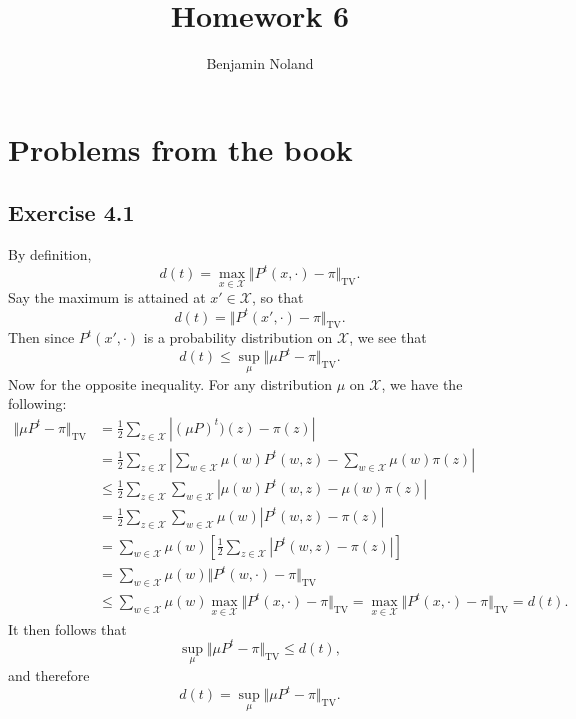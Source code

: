 \documentclass[12pt]{article}
\title{Homework 6}
\author{Benjamin Noland}
\date{}
\begin{document}
\maketitle

\section*{Problems from the book}

\subsection*{Exercise 4.1}

By definition,
\begin{equation*}
d(t) = \max_{x \in \mathcal{X}} \Vert P^t(x, \cdot) - \pi \Vert_\mathrm{TV}.
\end{equation*}
Say the maximum is attained at $x' \in \mathcal{X}$, so that
\begin{equation*}
d(t) = \Vert P^t(x', \cdot) - \pi \Vert_\mathrm{TV}.
\end{equation*}
Then since $P^t(x', \cdot)$ is a probability distribution on $\mathcal{X}$, we see that
\begin{equation*}
d(t) \leq \sup_{\mu} \Vert \mu P^t - \pi \Vert_\mathrm{TV}.
\end{equation*}
Now for the opposite inequality. For any distribution $\mu$ on $\mathcal{X}$, we have the following:
\begin{align*}
\Vert \mu P^t - \pi \Vert_\mathrm{TV} &= \frac{1}{2} \sum_{z \in \mathcal{X}} \left| (\mu P)^t)(z) - \pi(z) \right| \\
&= \frac{1}{2} \sum_{z \in \mathcal{X}} \left| \sum_{w \in \mathcal{X}} \mu(w) P^t(w, z) - \sum_{w \in \mathcal{X}} \mu(w) \pi(z) \right| \\
&\leq \frac{1}{2} \sum_{z \in \mathcal{X}} \sum_{w \in \mathcal{X}} \left| \mu(w) P^t(w, z) - \mu(w) \pi(z) \right| \\
&= \frac{1}{2} \sum_{z \in \mathcal{X}} \sum_{w \in \mathcal{X}} \mu(w) \left| P^t(w, z) - \pi(z) \right| \\
&= \sum_{w \in \mathcal{X}} \mu(w) \left[ \frac{1}{2} \sum_{z \in \mathcal{X}} \left| P^t(w, z) - \pi(z) \right| \right] \\
&= \sum_{w \in \mathcal{X}} \mu(w) \Vert P^t(w, \cdot) - \pi \Vert_\mathrm{TV} \\
&\leq \sum_{w \in \mathcal{X}} \mu(w) \max_{x \in \mathcal{X}} \Vert P^t(x, \cdot) - \pi \Vert_\mathrm{TV} = \max_{x \in \mathcal{X}} \Vert P^t(x, \cdot) - \pi \Vert_\mathrm{TV} = d(t).
\end{align*}
It then follows that
\begin{equation*}
\sup_{\mu} \Vert \mu P^t - \pi \Vert_\mathrm{TV} \leq d(t),
\end{equation*}
and therefore
\begin{equation*}
d(t) = \sup_{\mu} \Vert \mu P^t - \pi \Vert_\mathrm{TV}.
\end{equation*}
\end{document}
